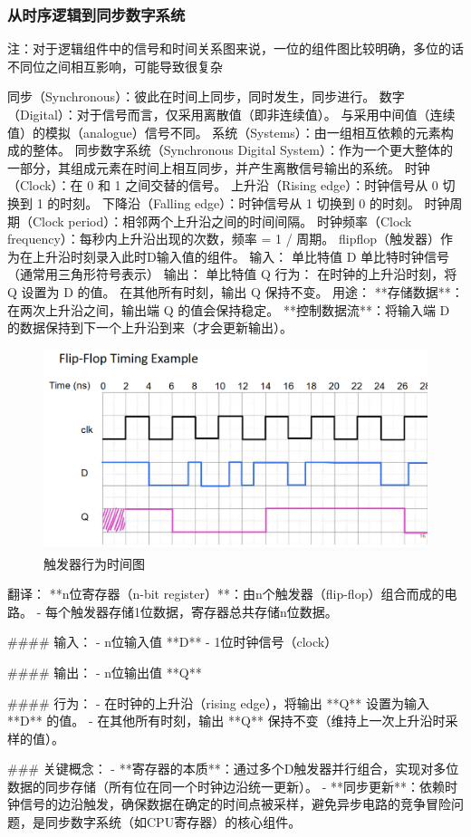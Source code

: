 \documentclass{ctexart}
\begin{document}
\subsubsection{从时序逻辑到同步数字系统}
注：对于逻辑组件中的信号和时间关系图来说，一位的组件图比较明确，多位的话不同位之间相互影响，可能导致很复杂\par
同步（Synchronous）：彼此在时间上同步，同时发生，同步进行。
数字（Digital）：对于信号而言，仅采用离散值（即非连续值）。
与采用中间值（连续值）的模拟（analogue）信号不同。
系统（Systems）：由一组相互依赖的元素构成的整体。
同步数字系统（Synchronous Digital System）：作为一个更大整体的一部分，其组成元素在时间上相互同步，并产生离散信号输出的系统。
时钟（Clock）：在 0 和 1 之间交替的信号。
上升沿（Rising edge）：时钟信号从 0 切换到 1 的时刻。
下降沿（Falling edge）：时钟信号从 1 切换到 0 的时刻。
时钟周期（Clock period）：相邻两个上升沿之间的时间间隔。
时钟频率（Clock frequency）：每秒内上升沿出现的次数，频率 = 1 / 周期。
flipflop（触发器）作为在上升沿时刻录入此时D输入值的组件。
输入：
单比特值 D
单比特时钟信号（通常用三角形符号表示）
输出：
单比特值 Q
行为：
在时钟的上升沿时刻，将 Q 设置为 D 的值。
在其他所有时刻，输出 Q 保持不变。
用途：
**存储数据**：在两次上升沿之间，输出端 Q 的值会保持稳定。  
**控制数据流**：将输入端 D 的数据保持到下一个上升沿到来（才会更新输出）。
\begin{figure}
    \centering
    \includegraphics[width=0.5\linewidth]{触发器行为时间图.png}
    \caption{触发器行为时间图}
    \label{fig:enter-label}
\end{figure}

翻译：  
**n位寄存器（n-bit register）**：由n个触发器（flip-flop）组合而成的电路。  
- 每个触发器存储1位数据，寄存器总共存储n位数据。  

#### 输入：  
- n位输入值 **D**  
- 1位时钟信号（clock）  

#### 输出：  
- n位输出值 **Q**  

#### 行为：  
- 在时钟的上升沿（rising edge），将输出 **Q** 设置为输入 **D** 的值。  
- 在其他所有时刻，输出 **Q** 保持不变（维持上一次上升沿时采样的值）。  


### 关键概念：  
- **寄存器的本质**：通过多个D触发器并行组合，实现对多位数据的同步存储（所有位在同一个时钟边沿统一更新）。  
- **同步更新**：依赖时钟信号的边沿触发，确保数据在确定的时间点被采样，避免异步电路的竞争冒险问题，是同步数字系统（如CPU寄存器）的核心组件。
\end{document}
